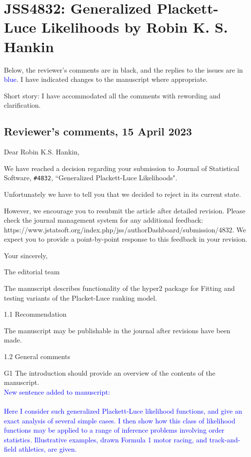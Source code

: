 \documentclass[12pt]{article}
\begin{document}
\section*{JSS4832: Generalized Plackett-Luce Likelihoods by Robin
K. S. Hankin}


Below, the reviewer's comments are in black, and the replies to the
issues are in \textcolor{blue}{blue}.  I have indicated changes to
the manuscript where appropriate.

Short story: I have accommodated all the comments with rewording and
clarification.

\subsection*{Reviewer's comments, 15 April 2023}


Dear Robin K.S. Hankin,

We have reached a decision regarding your submission to Journal of
Statistical Software, \verb+#4832+, ``Generalized Plackett-Luce
Likelihoods".

Unfortunately we have to tell you that we decided to reject in its current state.

However, we encourage you to resubmit the article after detailed
revision. Please check the journal management system for any
additional feedback:
https://www.jstatsoft.org/index.php/jss/authorDashboard/submission/4832. We
expect you to provide a point-by-point response to this feedback in
your revision.

Your sincerely,

The editorial team

The manuscript describes functionality of the hyper2 package for
Fitting and testing variants of the Placket-Luce ranking model.

1.1 Recommendation

The manuscript may be publishable in the journal after revisions have been
made.

1.2 General comments

G1 The introduction should provide an overview of the contents of the
manuscript. \\  \textcolor{blue}{New sentence added to manuscript:\\ \\
Here I consider such generalized Plackett-Luce likelihood functions,
and give an exact analysis of several simple cases.  I then show how
this class of likelihood functions may be applied to a range of
inference problems involving order statistics.  Illustrative examples,
drawn Formula 1 motor racing, and track-and-field athletics, are
given.}\\ \\
\end{document}
